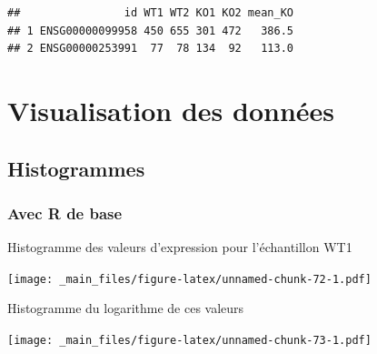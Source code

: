 \documentclass[
]{book}
\newenvironment{Shaded}{\begin{snugshade}}{\end{snugshade}}
\newcommand{\FunctionTok}[1]{\textcolor[rgb]{0.00,0.00,0.00}{#1}}
\newcommand{\NormalTok}[1]{#1}
\newcommand{\SpecialCharTok}[1]{\textcolor[rgb]{0.00,0.00,0.00}{#1}}
\begin{document}
\begin{verbatim}
##                id WT1 WT2 KO1 KO2 mean_KO
## 1 ENSG00000099958 450 655 301 472   386.5
## 2 ENSG00000253991  77  78 134  92   113.0
\end{verbatim}

\hypertarget{visualisation-des-donnuxe9es}{%
\chapter{Visualisation des données}\label{visualisation-des-donnuxe9es}}

\hypertarget{histogrammes}{%
\section{Histogrammes}\label{histogrammes}}

\hypertarget{avec-r-de-base}{%
\subsection{Avec R de base}\label{avec-r-de-base}}

Histogramme des valeurs d'expression pour l'échantillon WT1

\begin{Shaded}
\end{Shaded}

\texttt{[image: \_main\_files/figure-latex/unnamed-chunk-72-1.pdf]}

Histogramme du logarithme de ces valeurs

\begin{Shaded}
\end{Shaded}

\texttt{[image: \_main\_files/figure-latex/unnamed-chunk-73-1.pdf]}

\begin{Shaded}
\end{Shaded}
\end{document}
